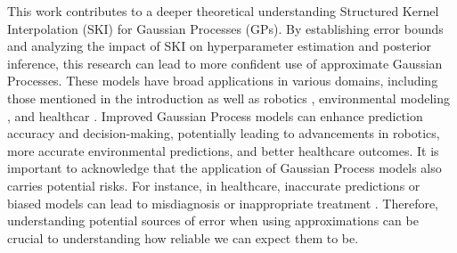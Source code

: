 This work contributes to a deeper theoretical understanding Structured Kernel Interpolation (SKI) \citep{wilson2015kernel} for Gaussian Processes (GPs). By establishing error bounds and analyzing the impact of SKI on hyperparameter estimation and posterior inference, this research can lead to more confident use of approximate Gaussian Processes. These models have broad applications in various domains, including those mentioned in the introduction as well as robotics \citep{deisenroth2015gaussian}, environmental modeling \citep{desai2023deep}, and healthcar \citep{alaa2017bayesian}. Improved Gaussian Process models can enhance prediction accuracy and decision-making, potentially leading to advancements in robotics, more accurate environmental predictions, and better healthcare outcomes. It is important to acknowledge that the application of Gaussian Process models also carries potential risks. For instance, in healthcare, inaccurate predictions or biased models can lead to misdiagnosis or inappropriate treatment \citep{morley2020ethics}. Therefore, understanding potential sources of error when using approximations can be crucial to understanding how reliable we can expect them to be.